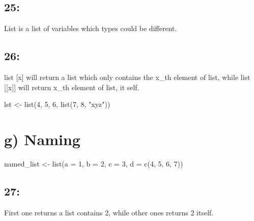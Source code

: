 \documentclass[
]{article}
\newenvironment{Shaded}{\begin{snugshade}}{\end{snugshade}}
\newcommand{\AttributeTok}[1]{\textcolor[rgb]{0.77,0.63,0.00}{#1}}
\newcommand{\DecValTok}[1]{\textcolor[rgb]{0.00,0.00,0.81}{#1}}
\newcommand{\FunctionTok}[1]{\textcolor[rgb]{0.00,0.00,0.00}{#1}}
\newcommand{\NormalTok}[1]{#1}
\newcommand{\OtherTok}[1]{\textcolor[rgb]{0.56,0.35,0.01}{#1}}
\newcommand{\StringTok}[1]{\textcolor[rgb]{0.31,0.60,0.02}{#1}}
\begin{document}
\hypertarget{section-24}{%
\subsection{25:}\label{section-24}}

List is a list of variables which types could be different.

\hypertarget{section-25}{%
\subsection{26:}\label{section-25}}

list {[}x{]} will return a list which only contains the x\_th element of
list, while list {[}{[}x{]}{]} will return x\_th element of list, it
self.

\begin{Shaded}
\begin{Highlighting}[]
\NormalTok{lst }\OtherTok{\textless{}{-}} \FunctionTok{list}\NormalTok{(}\DecValTok{4}\NormalTok{, }\DecValTok{5}\NormalTok{, }\DecValTok{6}\NormalTok{, }\FunctionTok{list}\NormalTok{(}\DecValTok{7}\NormalTok{, }\DecValTok{8}\NormalTok{, }\StringTok{"xyz"}\NormalTok{))}
\end{Highlighting}
\end{Shaded}

\hypertarget{g-naming}{%
\section{g) Naming}\label{g-naming}}

\begin{Shaded}
\begin{Highlighting}[]
\NormalTok{named\_list }\OtherTok{\textless{}{-}} \FunctionTok{list}\NormalTok{(}\AttributeTok{a =} \DecValTok{1}\NormalTok{, }\AttributeTok{b =} \DecValTok{2}\NormalTok{, }\AttributeTok{c =} \DecValTok{3}\NormalTok{, }\AttributeTok{d =} \FunctionTok{c}\NormalTok{(}\DecValTok{4}\NormalTok{, }\DecValTok{5}\NormalTok{, }\DecValTok{6}\NormalTok{, }\DecValTok{7}\NormalTok{))}
\end{Highlighting}
\end{Shaded}

\hypertarget{section-26}{%
\subsection{27:}\label{section-26}}

First one returns a list contains 2, while other ones returns 2 itself.
\end{document}
